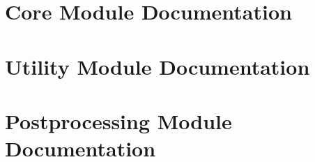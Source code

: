 \documentclass{book}
\begin{document}
\chapter[Modules]{Core Module Documentation}\label{coremodules}


























\chapter[Utility Modules]{Utility Module Documentation}\label{utilitymodules}



\chapter[Postprocessing Modules]{Postprocessing Module Documentation}\label{postmodules}


\end{document}
